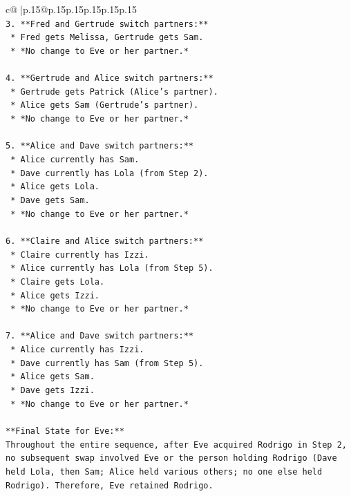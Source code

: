 \documentclass{article}
\begin{document}
{\begin{supertabular}{c@{$\;$}|p{.15\linewidth}@{}p{.15\linewidth}p{.15\linewidth}p{.15\linewidth}p{.15\linewidth}p{.15\linewidth}}
{{{\\ 
\texttt{3.  **Fred and Gertrude switch partners:**} \\
\texttt{    *   Fred gets Melissa, Gertrude gets Sam.} \\
\texttt{    *   *No change to Eve or her partner.*} \\
\\ 
\texttt{4.  **Gertrude and Alice switch partners:**} \\
\texttt{    *   Gertrude gets Patrick (Alice's partner).} \\
\texttt{    *   Alice gets Sam (Gertrude's partner).} \\
\texttt{    *   *No change to Eve or her partner.*} \\
\\ 
\texttt{5.  **Alice and Dave switch partners:**} \\
\texttt{    *   Alice currently has Sam.} \\
\texttt{    *   Dave currently has Lola (from Step 2).} \\
\texttt{    *   Alice gets Lola.} \\
\texttt{    *   Dave gets Sam.} \\
\texttt{    *   *No change to Eve or her partner.*} \\
\\ 
\texttt{6.  **Claire and Alice switch partners:**} \\
\texttt{    *   Claire currently has Izzi.} \\
\texttt{    *   Alice currently has Lola (from Step 5).} \\
\texttt{    *   Claire gets Lola.} \\
\texttt{    *   Alice gets Izzi.} \\
\texttt{    *   *No change to Eve or her partner.*} \\
\\ 
\texttt{7.  **Alice and Dave switch partners:**} \\
\texttt{    *   Alice currently has Izzi.} \\
\texttt{    *   Dave currently has Sam (from Step 5).} \\
\texttt{    *   Alice gets Sam.} \\
\texttt{    *   Dave gets Izzi.} \\
\texttt{    *   *No change to Eve or her partner.*} \\
\\ 
\texttt{**Final State for Eve:**} \\
\texttt{Throughout the entire sequence, after Eve acquired Rodrigo in Step 2, no subsequent swap involved Eve or the person holding Rodrigo (Dave held Lola, then Sam; Alice held various others; no one else held Rodrigo). Therefore, Eve retained Rodrigo.} \\
}}}
\end{supertabular}}
\end{document}
